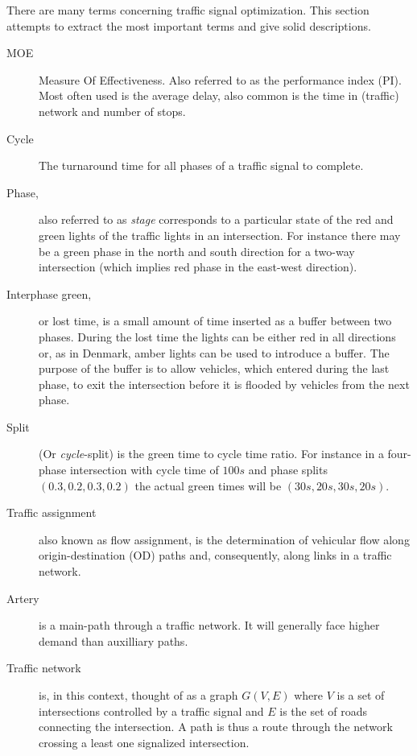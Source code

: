 \label{vocabulary}
There are many terms concerning traffic signal optimization. This section attempts to extract the most important terms and give solid descriptions.


\begin{description}

	\item[MOE] Measure Of Effectiveness. Also referred to as the performance index (PI).
	Most often used is the average delay, also common is the time in (traffic) network and number of stops. 
			
	\item[Cycle] The turnaround time for all phases of a traffic signal to complete.
	
	\item[Phase,] also referred to as \textit{stage} corresponds to a particular state of the red and green lights of the traffic lights in an intersection. 
	For instance there may be a green phase in the north and south direction for a two-way intersection (which implies red phase in the east-west direction).

\item[Interphase green,] or lost time, is a small amount of time inserted as a buffer between two phases. During the lost time the lights can be either red in all directions or, as in Denmark, amber lights can be used to introduce a buffer. The purpose of the buffer is to allow vehicles, which entered during the last phase, to exit the intersection before it is flooded by vehicles from the next phase.
	
	\item[Split] (Or \textit{cycle}-split) is the green time to cycle time ratio. For instance in a four-phase intersection with cycle time of $100s$ and phase splits $\left( 0.3, 0.2, 0.3, 0.2 \right)$ the actual green times will be $\left( 30s, 20s, 30s, 20s \right)$. 
	
	\item[Traffic assignment] also known as flow assignment, is the determination of vehicular flow along origin-destination (OD) paths and, consequently, along links in a traffic network. 

\item[Artery] is a main-path through a traffic network. It will generally face higher demand than auxilliary paths.

\item[Traffic network] is, in this context, thought of as a graph $G(V,E)$ where $V$ is a set of intersections controlled by a traffic signal and $E$ is the set of roads connecting the intersection. A path is thus a route through the network crossing a least one signalized intersection.


\end{description}

